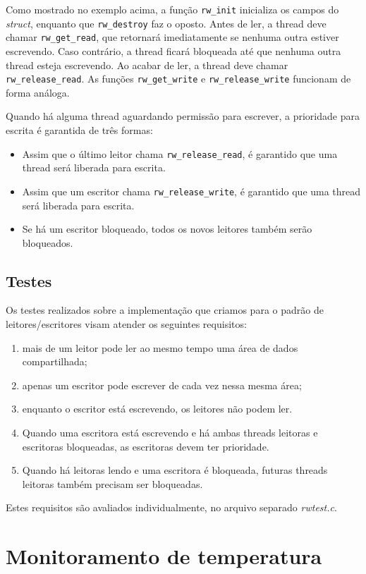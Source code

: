 \documentclass[12pt]{article}
\begin{document}
Como mostrado no exemplo acima,
a função \texttt{rw\_init}
inicializa os campos do \textit{struct},
enquanto que \texttt{rw\_destroy} faz o oposto.
Antes de ler,
a thread deve chamar \texttt{rw\_get\_read},
que retornará imediatamente
se nenhuma outra estiver escrevendo.
Caso contrário, a thread ficará bloqueada
até que nenhuma outra thread esteja escrevendo.
Ao acabar de ler,
a thread deve chamar \texttt{rw\_release\_read}.
As funções \texttt{rw\_get\_write} e \texttt{rw\_release\_write}
funcionam de forma análoga.

Quando há alguma thread aguardando permissão para escrever,
a prioridade para escrita é garantida de três formas:
\begin{itemize}
	\item Assim que o último leitor chama \texttt{rw\_release\_read},
		é garantido que uma thread será liberada para escrita.
	\item Assim que um escritor chama \texttt{rw\_release\_write},
		é garantido que uma thread será liberada para escrita.
	\item Se há um escritor bloqueado, todos os novos leitores
		também serão bloqueados.
\end{itemize}

\subsection{Testes}

Os testes realizados sobre a implementação que criamos
para o padrão de leitores/escritores visam atender
os seguintes requisitos:
\begin{enumerate}
\item mais de um leitor pode ler ao mesmo tempo
uma área de dados compartilhada;
\item apenas um escritor pode escrever
de cada vez nessa mesma área;
\item enquanto o escritor está escrevendo,
os leitores não podem ler.
\item Quando uma escritora está escrevendo e
há ambas threads leitoras e escritoras bloqueadas,
as escritoras devem ter prioridade.
\item Quando há leitoras lendo e uma escritora
é bloqueada, futuras threads leitoras
também precisam ser bloqueadas.
\end{enumerate}
Estes requisitos são avaliados individualmente,
no arquivo separado \textit{rwtest.c}.

\section{Monitoramento de temperatura}
\end{document}
